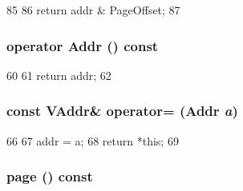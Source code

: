 \begin{DoxyCode}
85     {
86         return addr & PageOffset;
87     }
\end{DoxyCode}
\hypertarget{structPowerISA_1_1VAddr_acb58a2b913b1ee45cf52ff8a6f5297c5}{
\subsubsection[{operator Addr}]{\setlength{\rightskip}{0pt plus 5cm}operator {\bf Addr} () const}}
\label{structPowerISA_1_1VAddr_acb58a2b913b1ee45cf52ff8a6f5297c5}



\begin{DoxyCode}
60     {
61         return addr;
62     }
\end{DoxyCode}
\hypertarget{structPowerISA_1_1VAddr_a7a4215209d20e18c277206574eb1a86e}{
\subsubsection[{operator=}]{\setlength{\rightskip}{0pt plus 5cm}const {\bf VAddr}\& operator= ({\bf Addr} {\em a})}}
\label{structPowerISA_1_1VAddr_a7a4215209d20e18c277206574eb1a86e}



\begin{DoxyCode}
66     {
67         addr = a;
68         return *this;
69     }
\end{DoxyCode}
\hypertarget{structPowerISA_1_1VAddr_a0a2c0c43cd466cb2730c9387a7061a2b}{
\subsubsection[{page}]{ page () const}}
\label{structPowerISA_1_1VAddr_a0a2c0c43cd466cb2730c9387a7061a2b}



